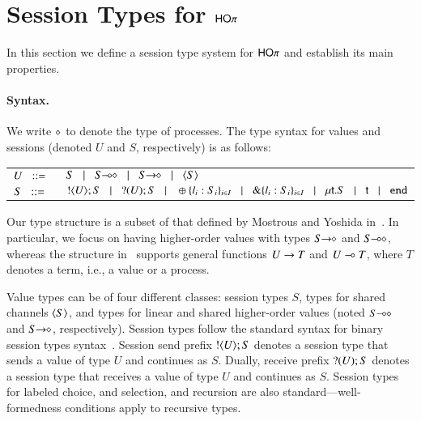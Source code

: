 \newcommand{\jrule}[3]{\displaystyle \trule{#3}~~\frac{#1 }{#2}}
\newcommand{\addenv}{\circ}

\section{Session Types for $\mathsf{HO}\pi$}
In this section we define a session type system for $\mathsf{HO}\pi$ and establish its main properties. 

\paragraph{Syntax.}
We write $\diamond$ to denote the type of processes.
The type syntax for values  and sessions (denoted $U$ and $S$, respectively) is as follows:

\begin{tabular}{cl}
 $U \;\;::=\;\; $ & $S \bnfbar \lhot{S} \bnfbar \shot{S} \bnfbar \chtype{S}$ \\
$S \;\;::=\;\;$ & $! \langle U \rangle ; S \;\;\;|\;\;\; ? (U) ; S
				\;\;\;|\;\;\; \oplus \{l_i:S_i\}_{i \in I} \;\;\;|\;\;\; \& \{l_i:S_i\}_{i \in I}
				 \;\;\;|\;\;\; \mu\mathsf{t}.S \;\;\;|\;\;\; \mathsf{t}  \;\;\;|\;\;\; \mathtt{end}$
\end{tabular}

\noindent 
Our type structure is a subset of that defined by Mostrous and Yoshida in~\cite{tlca07}.
In particular, we focus on having higher-order values with types
$S\!\! \rightarrow\!\! \diamond$ and $S\!\! \multimap\!\! \diamond$, whereas the structure in~\cite{tlca07} supports general functions $U \rightarrow T$ and 
$U \multimap T$, where $T$ denotes a term, i.e., a value or a process.

Value types can be of four different classes: session types $S$, 
types for shared channels $\langle S \rangle$, and types for linear and shared higher-order values (noted $S\!\! \multimap\!\! \diamond$ and $S\!\! \rightarrow\!\! \diamond$, respectively).
Session types follow the standard syntax for binary session types syntax~\cite{}. Session send prefix $! \langle U \rangle ; S$ 
denotes a session type that sends a value of type $U$ and continues as $S$. Dually, receive prefix $? (U) ; S$
denotes a session type that receives a value of type $U$ and continues as $S$. 
Session types for labeled choice, and selection, and recursion are also standard---well-formedness conditions apply to recursive types.

